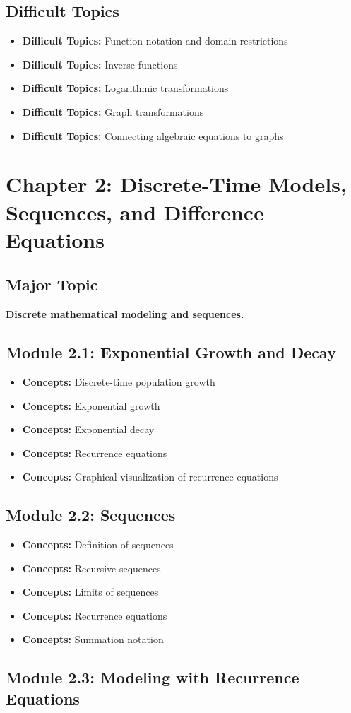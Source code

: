 \documentclass[11pt]{article}
\newcommand{\concept}[1]{\item \textbf{Concepts:} #1}
\newcommand{\difficult}[1]{\item \textbf{Difficult Topics:} #1}
\begin{document}
\subsection{Difficult Topics}

\begin{itemize}
    \difficult{Function notation and domain restrictions}
    \difficult{Inverse functions}
    \difficult{Logarithmic transformations}
    \difficult{Graph transformations}
    \difficult{Connecting algebraic equations to graphs}
\end{itemize}


\section{Chapter 2: Discrete-Time Models, Sequences, and Difference Equations}

\subsection{Major Topic}

\textbf{Discrete mathematical modeling and sequences.}

\subsection{Module 2.1: Exponential Growth and Decay}

\begin{itemize}
    \concept{Discrete-time population growth}
    \concept{Exponential growth}
    \concept{Exponential decay}
    \concept{Recurrence equations}
    \concept{Graphical visualization of recurrence equations}
\end{itemize}

\subsection{Module 2.2: Sequences}

\begin{itemize}
    \concept{Definition of sequences}
    \concept{Recursive sequences}
    \concept{Limits of sequences}
    \concept{Recurrence equations}
    \concept{Summation notation}
\end{itemize}

\subsection{Module 2.3: Modeling with Recurrence Equations}
\end{document}
